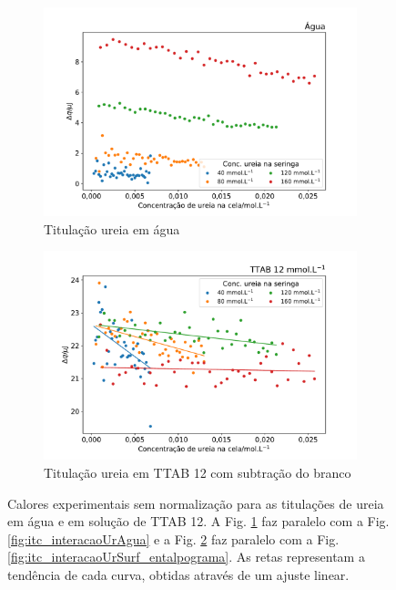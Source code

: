\begin{figure}[H]
	\begin{subfigure}{0.45\textwidth}
		\centering
		\includegraphics[width=\textwidth]{imagens/itc/interacao_branco_dq}
		\caption{Titulação ureia em água}
		\label{fig:itc_interacaoUreiaAguaDq}
	\end{subfigure} \qquad%
	\begin{subfigure}{0.45\textwidth}
		\centering
		\includegraphics[width=\textwidth]{imagens/itc/interacao_ureia_surf_dq}
		\caption{Titulação ureia em TTAB 12\mM{} com subtração do branco}
		\label{fig:itc_interacaoUreiaSurfDq}
	\end{subfigure}

	\caption{Calores experimentais sem normalização para as titulações de ureia em água e em solução de TTAB 12\mM. A Fig. \ref{fig:itc_interacaoUreiaAguaDq} faz paralelo com a Fig. \ref{fig:itc_interacaoUrAgua} e a Fig. \ref{fig:itc_interacaoUreiaSurfDq} faz paralelo com a Fig. 
	\ref{fig:itc_interacaoUrSurf_entalpograma}. As retas representam a tendência de cada curva, obtidas através de um ajuste linear.}
	\label{fig:itc_comparativo_tit_ureia_agua_ureia_ttab}
\end{figure}
	
